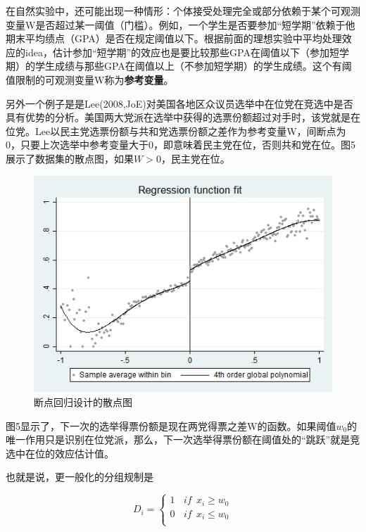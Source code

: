 \documentclass[cn,10pt,math=newtx,citestyle=gb7714-2015,bibstyle=gb7714-2015]{elegantbook}
\begin{document}
	在自然实验中，还可能出现一种情形：个体接受处理完全或部分依赖于某个可观测变量W是否超过某一阈值（门槛）。例如，一个学生是否要参加“短学期”依赖于他期末平均绩点（GPA）是否在规定阈值以下。根据前面的理想实验中平均处理效应的idea，估计参加“短学期”的效应也是要比较那些GPA在阈值以下（参加短学期）的学生成绩与那些GPA在阈值以上（不参加短学期）的学生成绩。这个有阈值限制的可观测变量W称为\textbf{参考变量}。
	
	另外一个例子是是Lee(2008,JoE)对美国各地区众议员选举中在位党在竞选中是否具有优势的分析。美国两大党派在选举中获得的选票份额超过对手时，该党就是在位党。Lee以民主党选票份额与共和党选票份额之差作为参考变量W，间断点为0，只要上次选举中参考变量大于0，即意味着民主党在位，否则共和党在位。图5展示了数据集的散点图，如果$W>0$，民主党在位。
	\begin{figure}[htbp]
		\centering
		\includegraphics[width=1\textwidth]{rdgraph.png}
		\caption{断点回归设计的散点图}\label{fig:digit}
	\end{figure}
	
	图5显示了，下一次的选举得票份额是现在两党得票之差W的函数。如果阈值$w_0$的唯一作用只是识别在位党派，那么，下一次选举得票份额在阈值处的“跳跃”就是竞选中在位的效应估计值。
	
	也就是说，更一般化的分组规制是
	
	\begin{equation}
		D_i= \left\{
		\begin{aligned}
			1~~~~if ~~x_i\geq{w_0}  \\
			0~~~~if ~~x_i\le{w_0} \\
		\end{aligned}
		\right.
	\end{equation}
	
\end{document}
